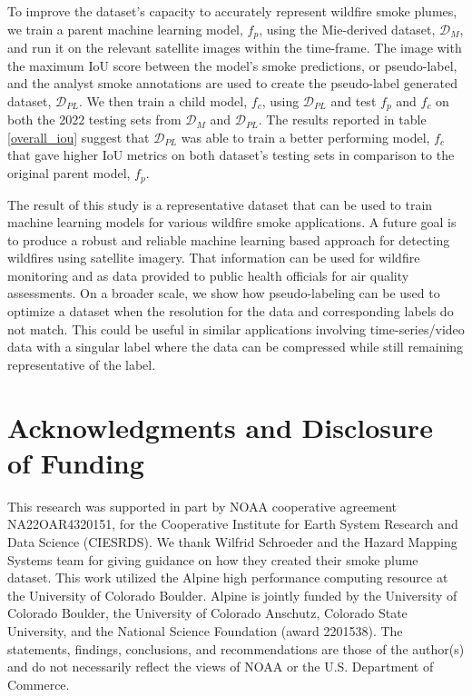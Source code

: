 \documentclass{article}
\begin{document}
To improve the dataset's capacity to accurately represent wildfire smoke plumes, we train a parent machine learning model, \(f_p\),  using the Mie-derived dataset, \(\mathcal{D}_M\), and run it on the relevant satellite images within the time-frame. The image with the maximum IoU score between the model's smoke predictions, or pseudo-label, and the analyst smoke annotations are used to create the pseudo-label generated dataset, \(\mathcal{D}_{PL}\). We then train a child model, \(f_c\), using \(\mathcal{D}_{PL}\) and test \(f_p\) and \(f_c\) on both the 2022 testing sets from \(\mathcal{D}_{M}\) and \(\mathcal{D}_{PL}\). The results reported in table \ref{overall_iou} suggest that \(\mathcal{D}_{PL}\) was able to train a better performing model, \(f_c\) that gave higher IoU metrics on both dataset's testing sets in comparison to the original parent model, \(f_p\).

The result of this study is a representative dataset that can be used to train machine learning models for various wildfire smoke applications. A future goal is to produce a robust and reliable machine learning based approach for detecting wildfires using satellite imagery. That information can be used for wildfire monitoring and as data provided to public health officials for air quality assessments. On a broader scale, we show how pseudo-labeling can be used to optimize a dataset when the resolution for the data and corresponding labels do not match. This could be useful in similar applications involving time-series/video data with a singular label where the data can be compressed while still remaining representative of the label. 

\section{Acknowledgments and Disclosure of Funding}

This research was supported in part by NOAA cooperative agreement NA22OAR4320151, for the Cooperative Institute for Earth System Research and Data Science (CIESRDS). We thank Wilfrid Schroeder and the Hazard Mapping Systems team for giving guidance on how they created their smoke plume dataset. This work utilized the Alpine high performance computing resource at the University of Colorado Boulder. Alpine is jointly funded by the University of Colorado Boulder, the University of Colorado Anschutz, Colorado State University, and the National Science Foundation (award 2201538). The statements, findings, conclusions, and recommendations are those of the author(s) and do not necessarily reflect the views of NOAA or the U.S. Department of Commerce. 


\end{document}
